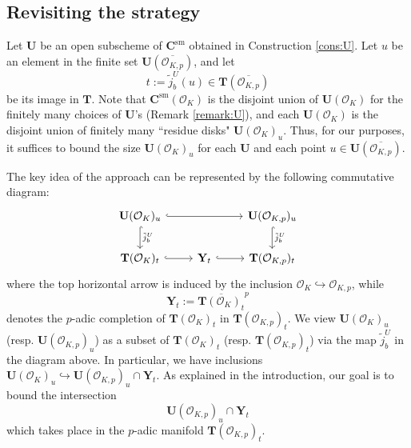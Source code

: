 \documentclass[11pt,oneside]{amsart}
\theoremstyle{plain}
\theoremstyle{definition}
\def\lra{{\longrightarrow}}
\DeclareMathOperator{\sm}{sm}
\def\TT{\mathbf{T}}
\def\CC{\mathbf{C}}
\def\U{\mathbf{U}}
\def\Y{\mathbf{Y}}
\def\oh{\mathcal{O}}
\begin{document}
\subsection{Revisiting the strategy}
Let $\U$ be an open subscheme of $\CC^{\sm}$ obtained in Construction \ref{cons:U}. Let $u$ be an element in the finite set $\U(\overline{\oh_{K, p}})$, and let
$$t:=\tilde{j}_b^{U}(u)\in \TT(\overline{\oh_{K, p}})$$ 
be its image in $\TT$. Note that $\CC^{\sm}(\oh_K)$ is the disjoint union of $\U(\oh_K)$ for the finitely many choices of $\U$'s (Remark \ref{remark:U}), and each $\U(\oh_K)$ is the disjoint union of finitely many ``residue disks" $\U(\oh_K)_u$. Thus, for our purposes, it suffices to bound the size $\U(\oh_K)_u$ for each $\U$ and each point $u \in \U(\overline{\oh_{K, p}})$.  


The key idea of the approach can be represented by the following commutative diagram:
\begin{equation}\label{diag:chab}
\begin{tikzcd}[row sep = 2em]
   \U(\oh_K)_u \arrow[hook]{d}{\tilde{j}_b^U}  
   \arrow[hook]{rr}
&&       \U(\oh_{K, p})_u \arrow[hook]{d}{\tilde{j}_b^U} 
 \\
   \TT(\oh_K)_t \arrow[hook]{r} 
    &  \Y_t \arrow[hook]{r} 
    & \TT(\oh_{K, p})_t
\end{tikzcd}
\end{equation}
where the top horizontal arrow is induced by the inclusion $\oh_K \hookrightarrow \oh_{K, p}$, while 
$$\Y_t := \overline{\TT(\oh_K)_t}^p$$ denotes the $p$-adic completion of $\TT(\oh_K)_t$ in $\TT(\oh_{K, p})_t$. We view $\U(\oh_K)_u$ (resp. $\U(\oh_{K, p})_u$) as a subset of $\TT(\oh_K)_t$ (resp. $\TT(\oh_{K, p})_t$) via the map $\tilde{j}_b^U$ in the diagram above. In particular, we have inclusions
$\U(\oh_K)_u \hookrightarrow   \U(\oh_{K, p})_u \cap \Y_t. $
As explained in the introduction,  our goal is to bound the intersection 
    \begin{equation}\label{intersection}
     \U(\oh_{K, p})_u \cap \Y_t
    \end{equation}
    which takes place in the $p$-adic manifold $\TT(\oh_{K, p})_t$. 
 
\end{document}
